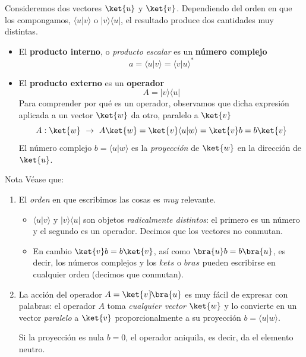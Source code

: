 \documentclass[a4paper,11pt]{book} %
\numberwithin{equation}{chapter}
\newcommand{\braket}[2]{\langle #1|#2\rangle}
\newcommand{\ketbra}[2]{| #1\rangle \! \langle #2|}
\begin{document}
Consideremos dos vectores $\ket{u}$ y $\ket{v}$. Dependiendo del orden en que los compongamos, $\braket{u}{v}$ o $\ketbra{v}{u}$, el resultado produce dos cantidades muy distintas.
\begin{itemize}
	\item El \textbf{producto interno}, o \textit{producto escalar} es un \textbf{número complejo}
$$
 a = \braket{u}{v} = \braket{v}{u}^* 
$$

	\item El \textbf{producto externo  }es un \textbf{operador}
	\begin{equation}
	A = \ketbra{v}{u}
	\end{equation}
Para comprender por qué es un operador, observamos que dicha expresión aplicada a un vector $\ket{w}$ da otro, paralelo a $\ket{v}$
	\begin{equation}
	A : \ket{w} ~\to ~ A\ket{w} =  \ket{v}\braket{u}{w}=\ket{v} b  = b \ket{v} 
	\end{equation}
El número complejo $b=\braket{u}{w}$ es  la \textit{proyección} de $\ket{w}$ en la dirección de $\ket{u}$.
\end{itemize}

\begin{mybox_blue}{Nota}
Véase que:
\begin{enumerate}
	\item El \textit{orden} en que escribimos las cosas es \textit{muy} relevante.
\vspace{0.1cm}	

	\begin{itemize}
		\item $\braket{u}{v}$ y $\ketbra{v}{u}$ son objetos \textit{radicalmente distintos}: el primero es un número y el segundo es un operador. Decimos que los vectores no conmutan.
\vspace{0.1cm}		
		
		\item En cambio $\ket{v} b  = b \ket{v}$, así como $\bra{u}b = b\bra{u}$, es decir,  los números complejos y los $kets$ o $bras$ pueden escribirse en cualquier orden (decimos que conmutan).
	\end{itemize}
	\vspace{0.2cm}
	
	\item La acción del operador  $A = \ket{v}\!\bra{u}$ es muy fácil de expresar con palabras: 
el operador $A$ toma \textit{cualquier vector} $\ket{w}$ y lo convierte en un vector \textit{paralelo} a $\ket{v}$ proporcionalmente a su proyección $b=\braket{u}{w}$. 
\vspace{0.1cm}

Si la proyección es nula $b=0$, el operador aniquila, es decir, da el elemento neutro.
\end{enumerate}

\end{mybox_blue}
\end{document}
